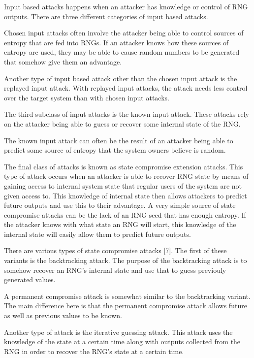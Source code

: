 \documentclass{article}
\begin{document}
    Input based attacks happens when an attacker has knowledge or control of RNG outputs.
    There are three different categories of input based attacks.
    
    Chosen input attacks often involve the attacker being able to control sources
    of entropy that are fed into RNGs. If an attacker knows how these
    sources of entropy are used, they may be able to cause random numbers
    to be generated that somehow give them an advantage.

    Another type of input based attack other than the chosen input attack is
    the replayed input attack. With replayed input attacks, the attack
    needs less control over the target system than with chosen input attacks.

    The third subclass of input attacks is the known input attack. These attacks
    rely on the attacker being able to guess or recover some internal state of the RNG.

    The known input attack can often be the result of an attacker being able to
    predict some source of entropy that the system owners believe is random.

    The final class of attacks is known as state compromise extension attacks.
    This type of attack occurs when an attacker is able to recover RNG state
    by means of gaining access to internal system state that regular users of the system
    are not given access to. This knowledge of internal state then allows attackers
    to predict future outputs and use this to their advantage.
    A very simple source of state compromise attacks can be the lack of an RNG
    seed that has enough entropy. If the attacker knows with what state an RNG
    will start, this knowledge of the internal state will easily allow them
    to predict future outputs.

    There are various types of state compromise attacks [7].
    The first of these variants is the backtracking attack. The purpose
    of the backtracking attack is to somehow recover an RNG's internal state
    and use that to guess previouly generated values.

    A permanent compromise attack is somewhat similar to the backtracking variant.
    The main difference here is that the permanent compromise attack
    allows future as well as previous values to be known.

    Another type of attack is the iterative guessing attack. This attack uses
    the knowledge of the state at a certain time along with outputs collected
    from the RNG in order to recover the RNG's state at a certain time.
\end{document}
